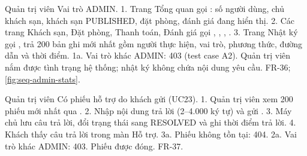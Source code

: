 {Quản trị viên}
{Vai trò ADMIN.}
{1. Trang Tổng quan gọi : số người dùng, chủ khách sạn, khách sạn PUBLISHED, đặt phòng, đánh giá đang hiển thị. 2. Các trang Khách sạn, Đặt phòng, Thanh toán, Đánh giá gọi , , , . 3. Trang Nhật ký gọi , trả 200 bản ghi mới nhất gồm người thực hiện, vai trò, phương thức, đường dẫn và thời điểm.}
{1a. Vai trò khác ADMIN: 403 (test case A2).}
{Quản trị viên nắm được tình trạng hệ thống; nhật ký không chứa nội dung yêu cầu.}
{FR-36; \cref{fig:seq-admin-stats}.}

{Quản trị viên}
{Có phiếu hỗ trợ do khách gửi (UC23).}
{1. Quản trị viên xem 200 phiếu mới nhất qua . 2. Nhập nội dung trả lời (2--4.000 ký tự) và gửi . 3. Máy chủ lưu câu trả lời, đổi trạng thái sang RESOLVED và ghi thời điểm trả lời. 4. Khách thấy câu trả lời trong màn Hỗ trợ.}
{3a. Phiếu không tồn tại: 404. 2a. Vai trò khác ADMIN: 403.}
{Phiếu được đóng.}
{FR-37.}

